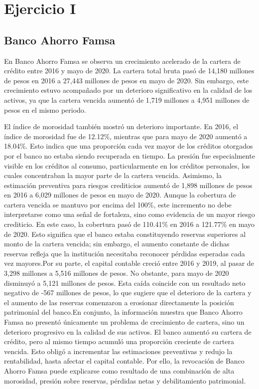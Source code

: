 \section{Ejercicio I}
\subsection{Banco Ahorro Famsa}
En Banco Ahorro Famsa se observa un crecimiento acelerado de la cartera de crédito entre 2016 y mayo de 2020. La cartera total bruta pasó de 14,180 millones de pesos en 2016 a 27,443 millones de pesos en mayo de 2020. Sin embargo, este crecimiento estuvo acompañado por un deterioro significativo en la calidad de los activos, ya que la cartera vencida aumentó de 1,719 millones a 4,951 millones de pesos en el mismo periodo. 

El índice de morosidad también mostró un deterioro importante. En 2016, el índice de morosidad fue de 12.12\%, mientras que para mayo de 2020 aumentó a 18.04\%. Esto indica que una proporción cada vez mayor de los créditos otorgados por el banco no estaba siendo recuperada en tiempo. La presión fue especialmente visible en los créditos al consumo, particularmente en los créditos personales, los cuales concentraban la mayor parte de la cartera vencida. Asimismo, la estimación preventiva para riesgos crediticios aumentó de 1,898 millones de pesos en 2016 a 6,029 millones de pesos en mayo de 2020. Aunque la cobertura de cartera vencida se mantuvo por encima del 100\%, este incremento no debe interpretarse como una señal de fortaleza, sino como evidencia de un mayor riesgo crediticio.
En este caso, la cobertura pasó de 110.41\% en 2016 a 121.77\% en mayo de 2020. Esto significa que el banco estaba constituyendo reservas superiores al monto de la cartera vencida; sin embargo, el aumento constante de dichas reservas refleja que la institución necesitaba reconocer pérdidas esperadas cada vez mayores.Por su parte, el capital contable creció entre 2016 y 2019, al pasar de 3,298 millones a 5,516 millones de pesos. No obstante, para mayo de 2020 disminuyó a 5,121 millones de pesos. Esta caída coincide con un resultado neto negativo de -567 millones de pesos, lo que sugiere que el deterioro de la cartera y el aumento de las reservas comenzaron a erosionar directamente la posición patrimonial del banco.En conjunto, la información muestra que Banco Ahorro Famsa no presentó únicamente un problema de crecimiento de cartera, sino un deterioro progresivo en la calidad de sus activos. El banco aumentó su cartera de crédito, pero al mismo tiempo acumuló una proporción creciente de cartera vencida. Esto obligó a incrementar las estimaciones preventivas y redujo la rentabilidad, hasta afectar el capital contable. Por ello, la revocación de Banco Ahorro Famsa puede explicarse como resultado de una combinación de alta morosidad, presión sobre reservas, pérdidas netas y debilitamiento patrimonial.

